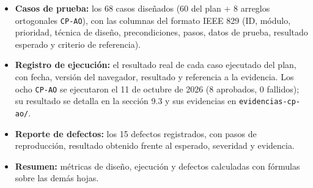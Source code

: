 \documentclass[11pt,a4paper]{article}
\begin{document}
\begin{itemize}
  \item \textbf{Casos de prueba:} los 68 casos diseñados (60 del plan + 8 arreglos
        ortogonales \texttt{CP-AO}), con las columnas del formato IEEE 829 (ID, módulo,
        prioridad, técnica de diseño, precondiciones, pasos, datos de prueba, resultado
        esperado y criterio de referencia).
  \item \textbf{Registro de ejecución:} el resultado real de cada caso ejecutado del plan,
        con fecha, versión del navegador, resultado y referencia a la evidencia. Los ocho
        \texttt{CP-AO} se ejecutaron el 11 de octubre de 2026 (8 aprobados, 0 fallidos);
        su resultado se detalla en la sección 9.3 y sus evidencias en \texttt{evidencias-cp-ao/}.
  \item \textbf{Reporte de defectos:} los 15 defectos registrados, con pasos de
        reproducción, resultado obtenido frente al esperado, severidad y evidencia.
  \item \textbf{Resumen:} métricas de diseño, ejecución y defectos calculadas con fórmulas
        sobre las demás hojas.
\end{itemize}
\end{document}
